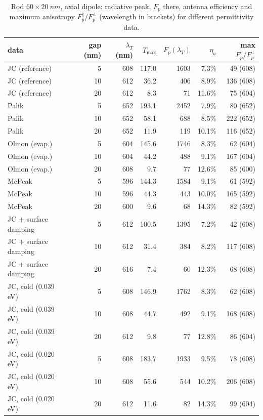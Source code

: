 \documentclass[11pt,a4paper]{article}
\newcommand{\Fp}{F_p}
\begin{document}
\begin{table}[h]\centering\small
\caption{Rod $60\times\SI{20}{nm}$, axial dipole: radiative peak, $\Fp$ there, antenna efficiency and maximum
anisotropy $\Fp^{\parallel}/\Fp^{\perp}$ (wavelength in brackets) for different permittivity data.}\label{tab:material}
\begin{tabular}{lrrrrrr}\toprule
data & gap (nm) & $\lambda_T$ (nm) & $T_{\max}$ & $\Fp(\lambda_T)$ & $\eta_a$ & max $\Fp^{\parallel}/\Fp^{\perp}$\\\midrule
JC (reference) & 5 & 608 & 117.0 & 1603 & 7.3\% & 49 (608)\\
JC (reference) & 10 & 612 & 36.2 & 406 & 8.9\% & 136 (608)\\
JC (reference) & 20 & 612 & 8.3 & 71 & 11.6\% & 75 (604)\\
Palik & 5 & 652 & 193.1 & 2452 & 7.9\% & 80 (652)\\
Palik & 10 & 652 & 58.1 & 688 & 8.5\% & 222 (652)\\
Palik & 20 & 652 & 11.9 & 119 & 10.1\% & 116 (652)\\
Olmon (evap.) & 5 & 604 & 145.6 & 1746 & 8.3\% & 62 (604)\\
Olmon (evap.) & 10 & 604 & 44.2 & 488 & 9.1\% & 167 (604)\\
Olmon (evap.) & 20 & 608 & 9.7 & 77 & 12.6\% & 85 (600)\\
McPeak & 5 & 596 & 144.3 & 1584 & 9.1\% & 61 (592)\\
McPeak & 10 & 596 & 44.3 & 443 & 10.0\% & 165 (592)\\
McPeak & 20 & 600 & 9.6 & 68 & 14.3\% & 82 (592)\\
JC + surface damping & 5 & 612 & 100.5 & 1395 & 7.2\% & 42 (608)\\
JC + surface damping & 10 & 612 & 31.4 & 384 & 8.2\% & 117 (608)\\
JC + surface damping & 20 & 616 & 7.4 & 60 & 12.3\% & 68 (608)\\
JC, cold (0.039 eV) & 5 & 608 & 146.9 & 1762 & 8.3\% & 62 (608)\\
JC, cold (0.039 eV) & 10 & 608 & 44.7 & 492 & 9.1\% & 168 (608)\\
JC, cold (0.039 eV) & 20 & 612 & 9.8 & 77 & 12.8\% & 86 (604)\\
JC, cold (0.020 eV) & 5 & 608 & 183.7 & 1933 & 9.5\% & 78 (608)\\
JC, cold (0.020 eV) & 10 & 608 & 55.6 & 544 & 10.2\% & 206 (608)\\
JC, cold (0.020 eV) & 20 & 612 & 11.6 & 82 & 14.3\% & 99 (604)\\
\bottomrule\end{tabular}\end{table}
\end{document}
